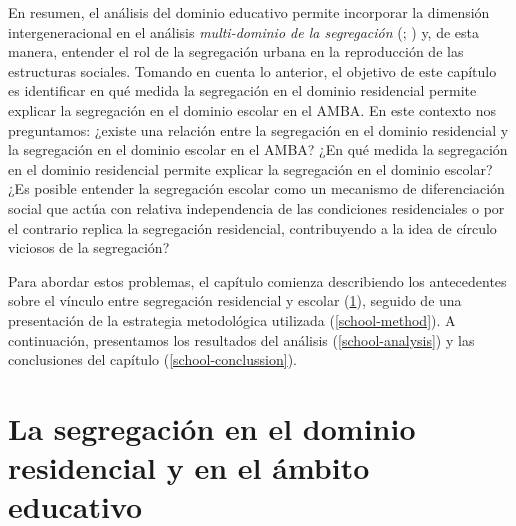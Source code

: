 \documentclass[
  spanish,
  a4paper,%
  chapterprefix=true,%
  DIV=calc,%
  twoside]{scrbook}%
\begin{document}
En resumen, el análisis del dominio educativo permite incorporar la
dimensión intergeneracional en el análisis \emph{multi-dominio de la
segregación} (; ) y, de esta manera, entender el
rol de la segregación urbana en la reproducción de las estructuras
sociales. Tomando en cuenta lo anterior, el objetivo de
este capítulo es identificar en qué medida la segregación en el dominio
residencial permite explicar la segregación en el dominio escolar en el
AMBA. En este contexto nos preguntamos: ¿existe una
relación entre la segregación en el dominio residencial y la segregación
en el dominio escolar en el AMBA? ¿En qué medida la segregación en el
dominio residencial permite explicar la segregación en el dominio
escolar? ¿Es posible entender la segregación escolar como un mecanismo
de diferenciación social que actúa con relativa independencia de las
condiciones residenciales o por el contrario replica la segregación
residencial, contribuyendo a la idea de círculo viciosos de la
segregación?

Para abordar estos problemas, el capítulo comienza describiendo los
antecedentes sobre el vínculo entre segregación residencial y escolar
(\ref{school-lit}), seguido de una presentación de la estrategia
metodológica utilizada (\ref{school-method}). A continuación,
presentamos los resultados del análisis (\ref{school-analysis}) y las
conclusiones del capítulo (\ref{school-conclussion}).

\section{La segregación en el dominio residencial y en el ámbito educativo}\label{school-lit}
\end{document}
